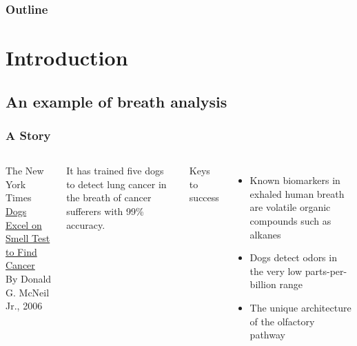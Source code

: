 \documentclass{beamer}
\newcommand{\mancite}[1]{{\scriptsize{\textbf{\color{MainGreen}{[#1] }}}}}
\begin{document}
\begin{frame}
  \frametitle{Outline}
  \tableofcontents
\end{frame}

\section{Introduction}

\subsection{An example of breath analysis}

\begin{frame}
\frametitle{A Story}
\begin{columns}
The New York Times \\
\href{http://www.nytimes.com/2006/01/17/health/17dog.html}{Dogs Excel on Smell Test to Find Cancer} \\
{\scriptsize By Donald G. McNeil Jr., 2006}

\begin{block}{}
It has trained five dogs to detect lung cancer in the breath of cancer sufferers with 99\% accuracy. \\
\mancite{Pearce et al., 2003}
\end{block}

Keys to success
\begin{itemize}
  \item Known biomarkers in exhaled human breath
    are volatile organic compounds such as alkanes 
  \item Dogs detect odors in the very low parts-per-billion range
  \item The unique architecture of the olfactory pathway
\end{itemize}  


\end{columns}
\end{frame}
\end{document}
